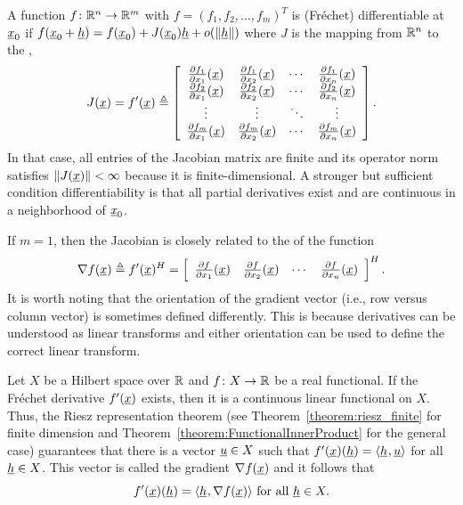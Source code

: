 \begin{example}
A function $f\colon \mathbb{R}^n \to \mathbb{R}^m$ with $f = (f_1,f_2,\ldots,f_m)^T$ is (Fr\'{e}chet) differentiable at $\underline{x}_0$ if $f(\underline{x}_0 + \underline{h})=f(\underline{x}_0)+J(\underline{x}_0) \underline{h} + o(\|\underline{h}\|)$ where $J$ is the mapping from $\mathbb{R}^n$ to the ,
\[ J(\underline{x})=f'(\underline{x}) \triangleq \left[ \begin{array}{cccc} \frac{\partial  f_1}{\partial  x_1} (\underline{x}) & \frac{\partial  f_1}{\partial  x_2} (\underline{x}) & \cdots & \frac{\partial  f_1}{\partial  x_n} (\underline{x}) \\
\frac{\partial  f_2}{\partial  x_1} (\underline{x}) & \frac{\partial  f_2}{\partial  x_2} (\underline{x}) & \cdots & \frac{\partial  f_2}{\partial  x_n} (\underline{x}) \\
\vdots & \vdots & \ddots & \vdots \\
\frac{\partial  f_m}{\partial  x_1} (\underline{x}) & \frac{\partial  f_m}{\partial  x_2} (\underline{x}) & \cdots & \frac{\partial  f_m}{\partial  x_n} (\underline{x}) \end{array} \right]. \]
In that case, all entries of the Jacobian matrix are finite and its operator norm satisfies $\| J(\underline{x}) \| < \infty$ because it is finite-dimensional.
A stronger but sufficient condition differentiability is that all partial derivatives exist and are continuous in a neighborhood of $\underline x_0$.

If $m=1$, then the Jacobian is closely related to the  of the function
\[ \nabla f(\underline{x}) \triangleq f'(\underline{x})^H =  \left[ \begin{array}{cccc} \frac{\partial  f}{\partial  x_1} (\underline{x}) & \frac{\partial  f}{\partial  x_2} (\underline{x}) & \cdots & \frac{\partial  f}{\partial  x_n} (\underline{x}) \end{array} \right]^H . \]
It is worth noting that the orientation of the gradient vector (i.e., row versus column vector) is sometimes defined differently.
This is because derivatives can be understood as linear transforms and either orientation can be used to define the correct linear transform. 
\end{example}

\begin{example}
Let $X$ be a Hilbert space over $\mathbb{R}$ and $f\colon X \to \mathbb{R}$ be a real functional.
If the Fr\'{e}chet derivative $f'(\underline{x})$ exists, then it is a continuous linear functional on $X$.
Thus, the Riesz representation theorem (see Theorem~\ref{theorem:riesz_finite} for finite dimension and Theorem~\ref{theorem:FunctionalInnerProduct} for the general case) guarantees that there is a vector $\underline{u} \in X$ such that
$ f'(\underline{x})(\underline{h}) = {\langle \underline{h}  \mskip1mu ,  \underline{u}  \rangle} $ for all $\underline{h}\in X$.
This vector is called the gradient $\nabla f(\underline{x})$ and it follows that
$$ f'(\underline{x})(\underline{h}) = {\langle \underline{h}  \mskip1mu ,  \nabla f (\underline{x})  \rangle} \text{ for all } \underline{h}\in X. $$
\end{example}

